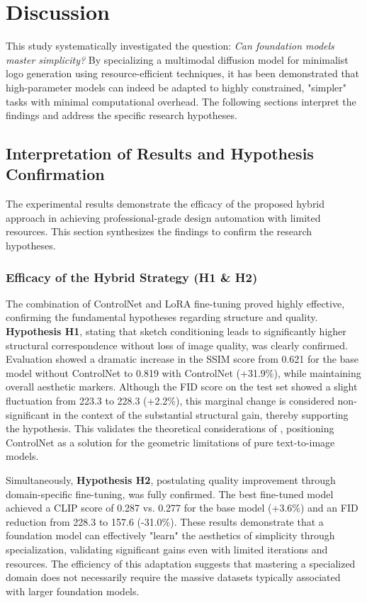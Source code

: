 \newpage
\section{Discussion}\label{sec:diskussion}

This study systematically investigated the question: \textit{Can foundation models master simplicity?} By specializing a multimodal diffusion model for minimalist logo generation using resource-efficient techniques, it has been demonstrated that high-parameter models can indeed be adapted to highly constrained, "simpler" tasks with minimal computational overhead. The following sections interpret the findings and address the specific research hypotheses.

\subsection{Interpretation of Results and Hypothesis Confirmation}

The experimental results demonstrate the efficacy of the proposed hybrid approach in achieving professional-grade design automation with limited resources. This section synthesizes the findings to confirm the research hypotheses.

\subsubsection*{Efficacy of the Hybrid Strategy (H1 \& H2)}
The combination of ControlNet and LoRA fine-tuning proved highly effective, confirming the fundamental hypotheses regarding structure and quality.
\textbf{Hypothesis H1}, stating that sketch conditioning leads to significantly higher structural correspondence without loss of image quality, was clearly confirmed. Evaluation showed a dramatic increase in the SSIM score from 0.621 for the base model without ControlNet to 0.819 with ControlNet (+31.9\%), while maintaining overall aesthetic markers. Although the FID score on the test set showed a slight fluctuation from 223.3 to 228.3 (+2.2\%), this marginal change is considered non-significant in the context of the substantial structural gain, thereby supporting the hypothesis. This validates the theoretical considerations of \citet{ZHANG2023}, positioning ControlNet as a solution for the geometric limitations of pure text-to-image models.

Simultaneously, \textbf{Hypothesis H2}, postulating quality improvement through domain-specific fine-tuning, was fully confirmed. The best fine-tuned model achieved a CLIP score of 0.287 vs. 0.277 for the base model (+3.6\%) and an FID reduction from 228.3 to 157.6 (-31.0\%). These results demonstrate that a foundation model can effectively "learn" the aesthetics of simplicity through specialization, validating significant gains even with limited iterations and resources. The efficiency of this adaptation suggests that mastering a specialized domain does not necessarily require the massive datasets typically associated with larger foundation models.

